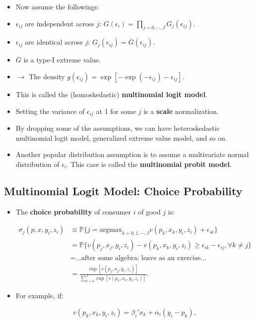 \documentclass[]{book}
\providecommand{\tightlist}{%
  \setlength{\itemsep}{0pt}\setlength{\parskip}{0pt}}
\begin{document}
\begin{itemize}
\item
  Now assume the followings:
\item
  \(\epsilon_{ij}\) are independent across \(j\):
  \(G(\epsilon_i) = \prod_{j = 0, \cdots, J} G_j(\epsilon_{ij})\).
\item
  \(\epsilon_{ij}\) are identical across \(j\):
  \(G_j(\epsilon_{ij}) = \overline{G}(\epsilon_{ij})\).
\item
  \(\overline{G}\) is a type-I extreme value.
\item
  \(\rightarrow\) The density
  \(g(\epsilon_{ij}) = \exp[-\exp(-\epsilon_{ij}) - \epsilon_{ij}]\).
\item
  This is called the (homoskedastic) \textbf{multinomial logit model}.
\item
  Setting the variance of \(\epsilon_{ij}\) at 1 for some \(j\) is a
  \textbf{scale} normalization.
\item
  By dropping some of the assumptions, we can have heteroskedastic
  multinomial logit model, generalized extreme value model, and so on.
\item
  Another popular distribution assumption is to assume a multivariate
  normal distribution of \(\epsilon_i\). This case is called the
  \textbf{multinomial probit model}.
\end{itemize}

\subsection{Multinomial Logit Model: Choice
Probability}\label{multinomial-logit-model-choice-probability}

\begin{itemize}
\tightlist
\item
  The \textbf{choice probability} of consumer \(i\) of good \(j\) is:

  \begin{equation}
  \begin{split}
  \sigma_j(p, x, y_i, z_i) & \equiv \mathbb{P}\{j = \text{argmax}_{k = 0, 1, \cdots, J} v(p_k, x_k, y_i, z_i) + \epsilon_{ik}  \}\\
  &=\mathbb{P}\{v(p_j, x_j, y_i, z_i) -  v(p_k, x_k, y_i, z_i) \ge \epsilon_{ik} - \epsilon_{ij}, \forall k \neq j\}\\
  & = \text{...after some algebra: leave as an exercise...}\\
  &= \frac{\exp[v(p_j, x_j, y_i, z_i) ]}{\sum_{k = 0}^J \exp[v(p_k, x_k, y_i, z_i)] }.
  \end{split}
  \end{equation}
\item
  For example, if:

  \begin{equation}
  v(p_k, x_k, y_i, z_i) = \beta_i'x_k + \alpha_i (y_i - p_k),
  \end{equation}
\end{itemize}
\end{document}

